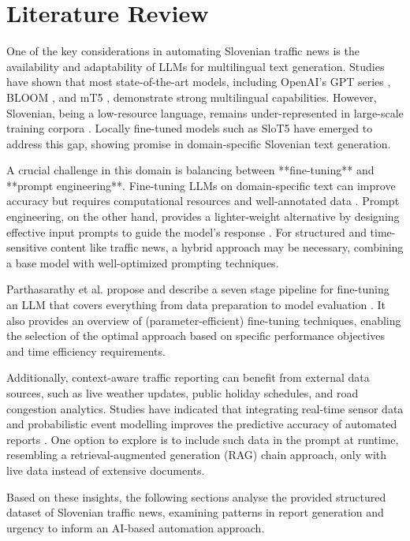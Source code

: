 \section*{Literature Review} 
One of the key considerations in automating Slovenian traffic news is the availability and adaptability of LLMs for multilingual text generation. Studies have shown that most state-of-the-art models, including OpenAI’s GPT series \cite{brown2020language}, BLOOM \cite{scao2022bloom}, and mT5 \cite{xue2021mt5}, demonstrate strong multilingual capabilities. However, Slovenian, being a low-resource language, remains under-represented in large-scale training corpora \cite{ulcar2021sloberta}. Locally fine-tuned models such as SloT5 \cite{ulcar2022slot5} have emerged to address this gap, showing promise in domain-specific Slovenian text generation.

A crucial challenge in this domain is balancing between **fine-tuning** and **prompt engineering**. Fine-tuning LLMs on domain-specific text can improve accuracy but requires computational resources and well-annotated data \cite{zhang2022fine}. Prompt engineering, on the other hand, provides a lighter-weight alternative by designing effective input prompts to guide the model’s response \cite{reynolds2021prompt}. For structured and time-sensitive content like traffic news, a hybrid approach may be necessary, combining a base model with well-optimized prompting techniques.

Parthasarathy et al. propose and describe a seven stage pipeline for fine-tuning an LLM that covers everything from data preparation to model evaluation \cite{ultimate2024}.
It also provides an overview of (parameter-efficient) fine-tuning techniques, enabling the selection of the optimal approach based on specific performance objectives and time efficiency requirements.

Additionally, context-aware traffic reporting can benefit from external data sources, such as live weather updates, public holiday schedules, and road congestion analytics.
Studies have indicated that integrating real-time sensor data and probabilistic event modelling improves the predictive accuracy of automated reports \cite{schelter2019automated}.
One option to explore is to include such data in the prompt at runtime, resembling a retrieval-augmented generation (RAG) chain approach, only with live data instead of extensive documents.

Based on these insights, the following sections analyse the provided structured dataset of Slovenian traffic news, examining patterns in report generation and urgency to inform an AI-based automation approach.

